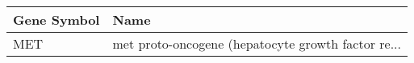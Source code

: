 \begin{tabular}{ll}
\toprule
Gene Symbol &                                               Name \\
\midrule
        MET & met proto-oncogene (hepatocyte growth factor re... \\
\bottomrule
\end{tabular}
